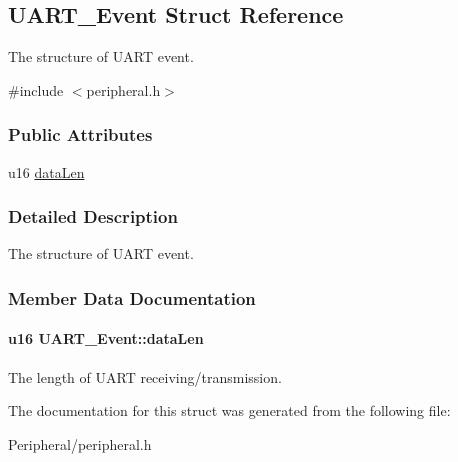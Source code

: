 \hypertarget{struct_u_a_r_t___event}{}\subsection{U\+A\+R\+T\+\_\+\+Event Struct Reference}
\label{struct_u_a_r_t___event}


The structure of U\+A\+RT event.  




{\ttfamily \#include $<$peripheral.\+h$>$}

\subsubsection*{Public Attributes}
\begin{DoxyCompactItemize}
\item 
u16 \hyperlink{struct_u_a_r_t___event_a418a0d3ad82d8225c9ded9c5c2ebf604}{data\+Len}
\end{DoxyCompactItemize}


\subsubsection{Detailed Description}
The structure of U\+A\+RT event. 

\subsubsection{Member Data Documentation}
\paragraph[{\texorpdfstring{data\+Len}{dataLen}}]{\setlength{\rightskip}{0pt plus 5cm}u16 U\+A\+R\+T\+\_\+\+Event\+::data\+Len}\hypertarget{struct_u_a_r_t___event_a418a0d3ad82d8225c9ded9c5c2ebf604}{}\label{struct_u_a_r_t___event_a418a0d3ad82d8225c9ded9c5c2ebf604}
The length of U\+A\+RT receiving/transmission. 

The documentation for this struct was generated from the following file\+:\begin{DoxyCompactItemize}
\item 
Peripheral/peripheral.\+h\end{DoxyCompactItemize}
